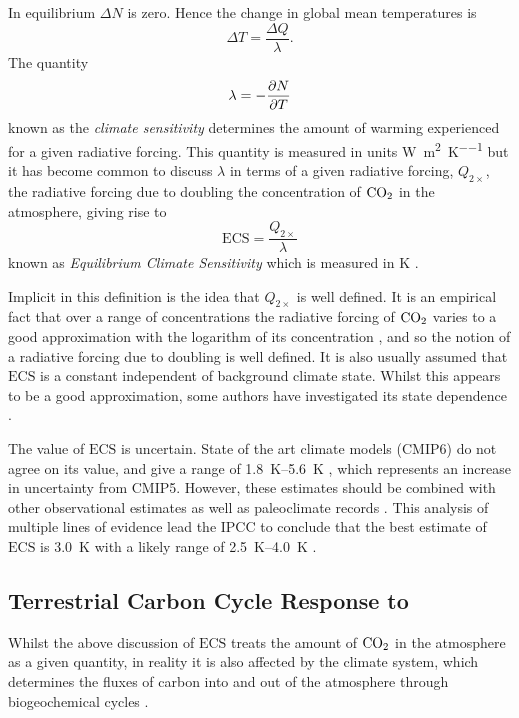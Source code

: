 In equilibrium $\Delta N$ is zero. Hence the change in global mean temperatures is
\begin{equation}
  \label{eq:response_to_radiative_forcing}
  \Delta T = \frac{\Delta Q}{\lambda}.
\end{equation}
The quantity
\begin{equation}
  \label{eq:climate_sensitivity}
  \lambda = -\pdv{N}{T}
\end{equation}
known as the \emph{climate sensitivity} determines the amount of warming experienced for a given radiative forcing. This quantity is measured
in units \si{\watt\per\square\meter\per\kelvin} but it has become common to discuss $\lambda$ in terms of a given radiative forcing, $Q_{2\times}$,
the radiative forcing due to doubling the concentration of $\ce{CO2}$ in the atmosphere, giving rise to
\begin{equation}
  \label{eq:definition_of_ECS}
  \mathrm{ECS} = \frac{Q_{2\times}}{\lambda}
\end{equation}
known as \emph{Equilibrium Climate Sensitivity} which is measured in \si{\kelvin} \parencite{Charney1979}.

Implicit in this definition is the idea that $Q_{2\times}$ is well defined. It is an empirical fact that over a range of concentrations the radiative forcing
of $\ce{CO2}$ varies to a good approximation with the logarithm of its concentration \parencite{Pierrehumbert2010}, and so the notion of a radiative forcing due to doubling is well defined.
It is also usually assumed that $\mathrm{ECS}$ is a constant independent of background climate state. Whilst this appears to be a good approximation, some authors
have investigated its state dependence \parencite{Ashwin2019,Caballero2013}.

The value of $\mathrm{ECS}$ is uncertain. State of the art climate models (CMIP6) do not agree on its value, and give a range of
\SIrange{1.8}{5.6}{\kelvin} \parencite{Zelinka2020}, which represents an increase in uncertainty from CMIP5.
However, these estimates should be combined with other observational estimates as well as paleoclimate records \parencite{Sherwood2020}. This analysis of multiple lines 
of evidence lead the IPCC to conclude that the best estimate of $\mathrm{ECS}$ is \SI{3.0}{\kelvin} with a likely range of \SIrange{2.5}{4.0}{\kelvin} \parencite{AR6}.

\subsection{Terrestrial Carbon Cycle Response to }
Whilst the above discussion of $\mathrm{ECS}$ treats the amount of $\ce{CO2}$ in the atmosphere as a given quantity, in reality it is also affected by the climate
system, which determines the fluxes of carbon into and out of the atmosphere through biogeochemical cycles \parencite{Rothman2014}.

